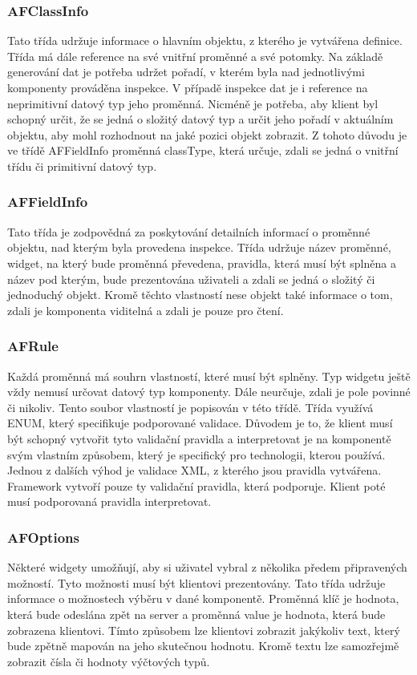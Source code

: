 \subsubsection{AFClassInfo}
Tato třída udržuje informace o hlavním objektu, z kterého je vytvářena definice. Třída má dále reference na své vnitřní proměnné a své potomky. Na základě generování dat je potřeba udržet pořadí, v kterém byla nad jednotlivými komponenty prováděna inspekce. V případě inspekce dat je i reference na neprimitivní datový typ jeho proměnná. Nicméně je potřeba, aby klient byl schopný určit, že se jedná o složitý datový typ a určit jeho pořadí v aktuálním objektu, aby mohl rozhodnout na jaké pozici objekt zobrazit. Z tohoto důvodu je ve třídě AFFieldInfo proměnná classType, která určuje, zdali se jedná o vnitřní třídu či primitivní datový typ.
\subsubsection{AFFieldInfo}
Tato třída je zodpovědná za poskytování detailních informací o proměnné objektu, nad kterým byla provedena inspekce. Třída udržuje název proměnné, widget, na který bude proměnná převedena, pravidla, která musí být splněna a název pod kterým, bude prezentována uživateli a zdali se jedná o složitý či jednoduchý objekt. Kromě těchto vlastností nese objekt také informace o tom, zdali je komponenta viditelná a zdali je pouze pro čtení.
\subsubsection{AFRule}
Každá proměnná má souhrn vlastností, které musí být splněny. Typ widgetu ještě vždy nemusí určovat datový typ komponenty. Dále neurčuje, zdali je pole povinné či nikoliv. Tento soubor vlastností je popisován v této třídě. Třída využívá ENUM, který specifikuje podporované validace. Důvodem je to, že klient musí být schopný vytvořit tyto validační pravidla a interpretovat je na komponentě svým vlastním způsobem, který je specifický pro technologii, kterou používá. Jednou z dalších výhod je validace XML, z kterého jsou pravidla vytvářena. Framework vytvoří pouze ty validační pravidla, která podporuje. Klient poté musí podporovaná pravidla interpretovat. 
\subsubsection{AFOptions}
Některé widgety umožňují, aby si uživatel vybral z několika předem připravených možností. Tyto možnosti musí být klientovi prezentovány. Tato třída udržuje informace o možnostech výběru v dané komponentě. Proměnná klíč je hodnota, která bude odeslána zpět na server a proměnná value je hodnota, která bude zobrazena klientovi. Tímto způsobem lze klientovi zobrazit jakýkoliv text, který bude zpětně mapován na jeho skutečnou hodnotu. Kromě textu lze samozřejmě zobrazit čísla či hodnoty výčtových typů.

